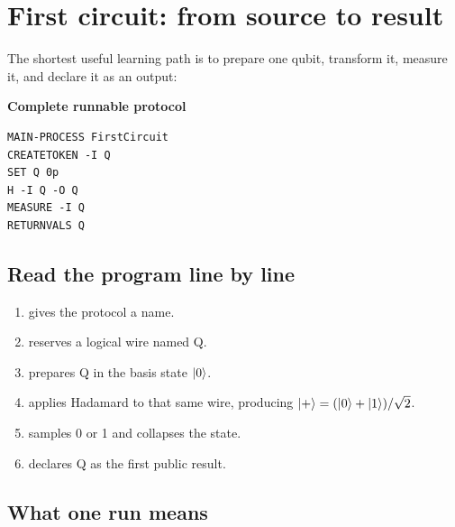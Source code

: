 \section{First circuit: from source to result}

The shortest useful learning path is to prepare one qubit, transform it,
measure it, and declare it as an output:

\textbf{Complete runnable protocol}
\begin{lstlisting}
MAIN-PROCESS FirstCircuit
CREATETOKEN -I Q
SET Q 0p
H -I Q -O Q
MEASURE -I Q
RETURNVALS Q
\end{lstlisting}

\subsection{Read the program line by line}

\begin{enumerate}
  \item {} gives the protocol a name.
  \item {} reserves a logical wire named Q.
  \item {} prepares Q in the basis state $\lvert 0\rangle$.
  \item {} applies Hadamard to that same wire, producing
  $\lvert +\rangle=(\lvert 0\rangle+\lvert 1\rangle)/\sqrt2$.
  \item {} samples 0 or 1 and collapses the state.
  \item {} declares Q as the first public result.
\end{enumerate}

\begin{center}
\end{center}

\subsection{What one run means}

